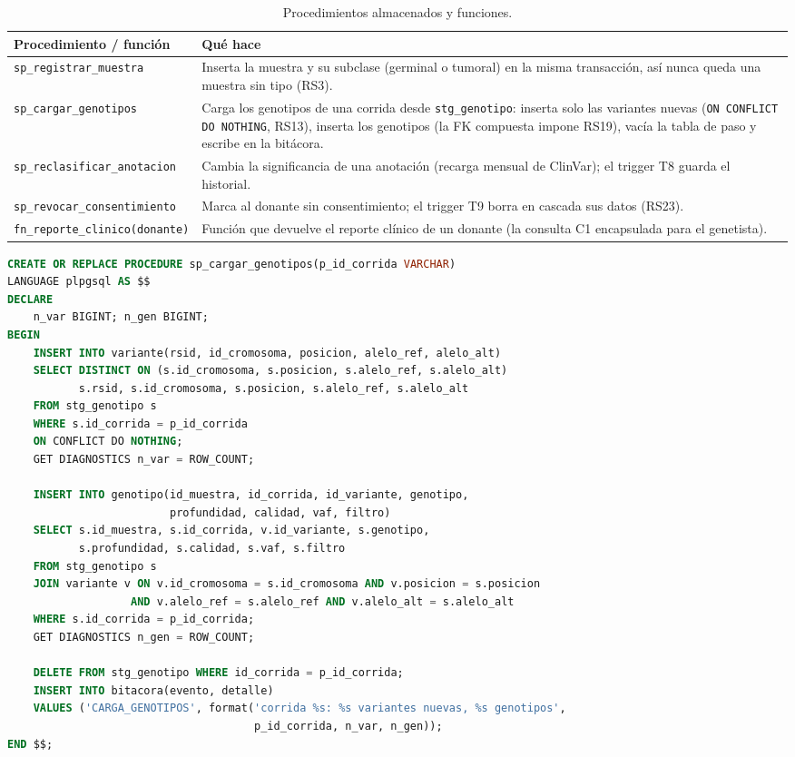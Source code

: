 \begin{table}[H]
\centering\small
\begin{tabular}{@{}>{\raggedright\arraybackslash}p{4.6cm}>{\raggedright\arraybackslash}p{9.8cm}@{}}
\toprule
Procedimiento / función & Qué hace \\
\midrule
\texttt{sp\_\allowbreak{}registrar\_\allowbreak{}muestra} & Inserta la muestra y su subclase (germinal o tumoral) en la misma transacción, así nunca queda una muestra sin tipo (RS3). \\
\texttt{sp\_\allowbreak{}cargar\_\allowbreak{}genotipos} & Carga los genotipos de una corrida desde \texttt{stg\_\allowbreak{}genotipo}: inserta solo las variantes nuevas (\texttt{ON CONFLICT DO NOTHING}, RS13), inserta los genotipos (la FK compuesta impone RS19), vacía la tabla de paso y escribe en la bitácora. \\
\texttt{sp\_\allowbreak{}reclasificar\_\allowbreak{}anotacion} & Cambia la significancia de una anotación (recarga mensual de ClinVar); el trigger T8 guarda el historial. \\
\texttt{sp\_\allowbreak{}revocar\_\allowbreak{}consentimiento} & Marca al donante sin consentimiento; el trigger T9 borra en cascada sus datos (RS23). \\
\texttt{fn\_\allowbreak{}reporte\_\allowbreak{}clinico(donante)} & Función que devuelve el reporte clínico de un donante (la consulta C1 encapsulada para el genetista). \\
\bottomrule
\end{tabular}
\caption{Procedimientos almacenados y funciones.}
\end{table}
\begin{lstlisting}[language=SQL,caption={Procedimiento de carga de genotipos de una corrida}]
CREATE OR REPLACE PROCEDURE sp_cargar_genotipos(p_id_corrida VARCHAR)
LANGUAGE plpgsql AS $$
DECLARE
    n_var BIGINT; n_gen BIGINT;
BEGIN
    INSERT INTO variante(rsid, id_cromosoma, posicion, alelo_ref, alelo_alt)
    SELECT DISTINCT ON (s.id_cromosoma, s.posicion, s.alelo_ref, s.alelo_alt)
           s.rsid, s.id_cromosoma, s.posicion, s.alelo_ref, s.alelo_alt
    FROM stg_genotipo s
    WHERE s.id_corrida = p_id_corrida
    ON CONFLICT DO NOTHING;
    GET DIAGNOSTICS n_var = ROW_COUNT;

    INSERT INTO genotipo(id_muestra, id_corrida, id_variante, genotipo,
                         profundidad, calidad, vaf, filtro)
    SELECT s.id_muestra, s.id_corrida, v.id_variante, s.genotipo,
           s.profundidad, s.calidad, s.vaf, s.filtro
    FROM stg_genotipo s
    JOIN variante v ON v.id_cromosoma = s.id_cromosoma AND v.posicion = s.posicion
                   AND v.alelo_ref = s.alelo_ref AND v.alelo_alt = s.alelo_alt
    WHERE s.id_corrida = p_id_corrida;
    GET DIAGNOSTICS n_gen = ROW_COUNT;

    DELETE FROM stg_genotipo WHERE id_corrida = p_id_corrida;
    INSERT INTO bitacora(evento, detalle)
    VALUES ('CARGA_GENOTIPOS', format('corrida %s: %s variantes nuevas, %s genotipos',
                                      p_id_corrida, n_var, n_gen));
END $$;
\end{lstlisting}

